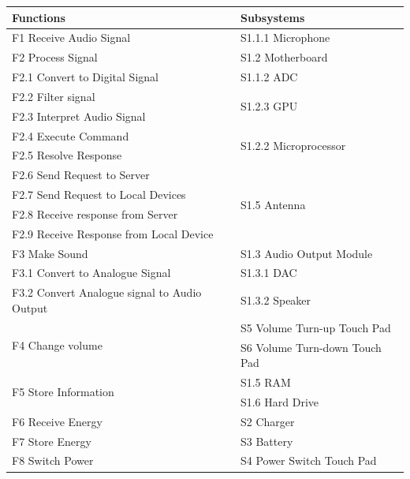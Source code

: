 \documentclass{article}
\begin{document}
\begin{center}
\begin{tabular}{| m{} | m{} |} 
 \hline
  Functions & Subsystems \\ 
 \hline\hline
  F1 Receive Audio Signal & S1.1.1 Microphone \\   
 \hline
	F2  Process Signal & S1.2 Motherboard \\   
 \hline
  F2.1 Convert to Digital Signal & S1.1.2 ADC \\   
 \hline
 F2.2 Filter signal & \multirow{2}{*}{S1.2.3 GPU}\\
\cline{1-1}
 F2.3 Interpret Audio Signal &\\
\hline
	F2.4 Execute Command & \multirow{2}{*}{S1.2.2 Microprocessor}\\
\cline{1-1}
 F2.5 Resolve Response &\\
 \hline
	F2.6 Send Request to Server & \multirow{4}{*}{S1.5 Antenna}\\
\cline{1-1}
	F2.7 Send Request to Local Devices &\\  
\cline{1-1}
	F2.8 Receive response from Server &\\
\cline{1-1}
	F2.9 Receive Response from Local Device &\\
 \hline
  F3 Make Sound & S1.3 Audio Output Module \\
 \hline
 F3.1 Convert to Analogue Signal & S1.3.1 DAC \\
 \hline
 F3.2 Convert Analogue signal to Audio Output & S1.3.2 Speaker \\
 \hline
 	\multirow{2}{*}{F4 Change volume} & S5 Volume Turn-up Touch Pad\\
 	\cline{2-2} 
 	& S6 Volume Turn-down Touch Pad\\
 \hline
 \multirow{2}{*}{F5 Store Information} & S1.5 RAM\\
 	\cline{2-2} 
 	& S1.6 Hard Drive\\
 \hline
 F6 Receive Energy  & S2 Charger \\   
 \hline
 F7 Store Energy & S3 Battery \\   
 \hline
 F8 Switch Power & S4 Power Switch Touch Pad \\   
 \hline
\end{tabular}
\end{center}
\end{document}
